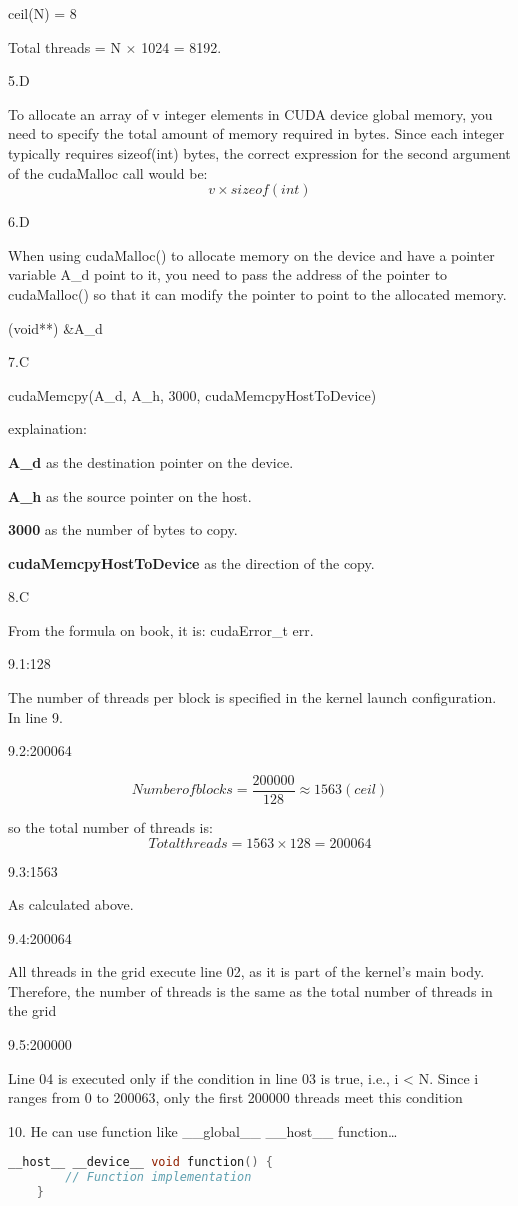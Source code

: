 \documentclass{article}
\begin{document}
ceil(N) = 8

Total threads = N $\times$ 1024 = 8192.
 
5.D

To allocate an array of v integer elements in CUDA device global memory, you need to specify the total amount of memory required in bytes. Since each integer typically requires sizeof(int) bytes, the correct expression for the second argument of the cudaMalloc call would be:
\begin{equation}
    v \times sizeof(int)
\end{equation}

6.D

When using cudaMalloc() to allocate memory on the device and have a pointer variable A\_d point to it, you need to pass the address of the pointer to cudaMalloc() so that it can modify the pointer to point to the allocated memory.

(void**)  \&A\_d

7.C

cudaMemcpy(A\_d, A\_h, 3000, cudaMemcpyHostToDevice)

explaination:

\textbf{A\_d} as the destination pointer on the device.

\textbf{A\_h} as the source pointer on the host.

\textbf{3000} as the number of bytes to copy.

\textbf{cudaMemcpyHostToDevice} as the direction of the copy.

8.C

From the formula on book, it is: cudaError\_t err.

9.1:128

The number of threads per block is specified in the kernel launch configuration. In line 9.

9.2:200064

\begin{equation}
    Number of blocks = \frac{200000}{128} \approx 1563(ceil)
\end{equation}

so the total number of threads is:
\begin{equation}
    Total threads = 1563 \times 128 = 200064
\end{equation}

9.3:1563

As calculated above.

9.4:200064

All threads in the grid execute line 02, as it is part of the kernel's main body. Therefore, the number of threads is the same as the total number of threads in the grid

9.5:200000

Line 04 is executed only if the condition in line 03 is true, i.e., i < N. Since i ranges from 0 to 200063, only the first 200000 threads meet this condition

10. He can use function like \_\_global\_\_ \_\_host\_\_ function{}\dots

\begin{lstlisting}[language=C++]
    __host__ __device__ void function() {
        // Function implementation
    }
\end{lstlisting}
    
\end{document}
